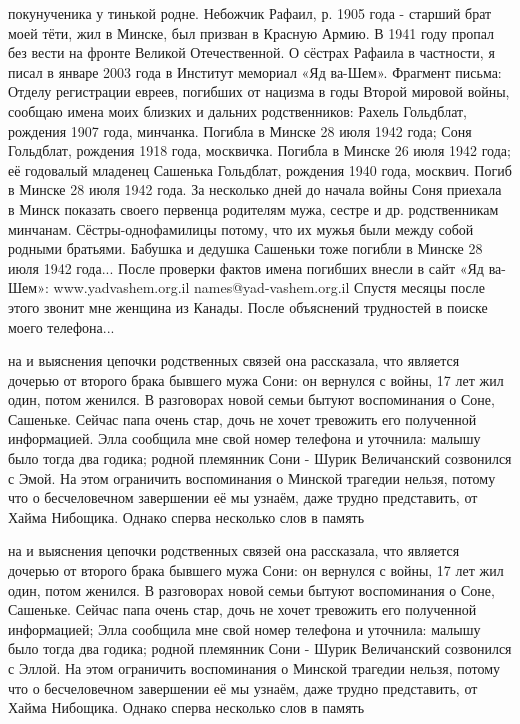 покунученика у тинькой родне. Небожчик Рафаил, р. 1905 года - старший брат моей тёти, жил в Минске, был призван в Красную Армию. В 1941 году пропал без вести на фронте Великой Отечественной. О сёстрах Рафаила в частности, я писал в январе 2003 года в Институт мемориал «Яд ва-Шем». Фрагмент письма: Отделу регистрации евреев, погибших от нацизма в годы Второй мировой войны, сообщаю имена моих близких и дальних родственников: Рахель Гольдблат, рождения 1907 года, минчанка. Погибла в Минске 28 июля 1942 года; Соня Гольдблат, рождения 1918 года, москвичка. Погибла в Минске 26 июля 1942 года; её годовалый младенец Сашенька Гольдблат, рождения 1940 года, москвич. Погиб в Минске 28 июля 1942 года. За несколько дней до начала войны Соня приехала в Минск показать своего первенца родителям мужа, сестре и др. родственникам минчанам. Сёстры-однофамилицы потому, что их мужья были между собой родными братьями. Бабушка и дедушка Сашеньки тоже погибли в Минске 28 июля 1942 года... После проверки фактов имена погибших внесли в сайт «Яд ва-Шем»: www.yadvashem.org.il names@yad-vashem.org.il Спустя месяцы после этого звонит мне женщина из Канады. После объяснений трудностей в поиске моего телефона...

на и выяснения цепочки родственных связей она рассказала, что является дочерью от второго брака бывшего мужа Сони: он вернулся с войны, 17 лет жил один, потом женился. В разговорах новой семьи бытуют воспоминания о Соне, Сашеньке. Сейчас папа очень стар, дочь не хочет тревожить его полученной информацией. Элла сообщила мне свой номер телефона и уточнила: малышу было тогда два годика; родной племянник Сони - Шурик Величанский созвонился с Эмой. На этом ограничить воспоминания о Минской трагедии нельзя, потому что о бесчеловечном завершении её мы узнаём, даже трудно представить, от Хайма Нибощика. Однако сперва несколько слов в память

на и выяснения цепочки родственных связей она рассказала, что является дочерью от второго брака бывшего мужа Сони: он вернулся с войны, 17 лет жил один, потом женился. В разговорах новой семьи бытуют воспоминания о Соне, Сашеньке. Сейчас папа очень стар, дочь не хочет тревожить его полученной информацией; Элла сообщила мне свой номер телефона и уточнила: малышу было тогда два годика; родной племянник Сони - Шурик Величанский созвонился с Эллой. На этом ограничить воспоминания о Минской трагедии нельзя, потому что о бесчеловечном завершении её мы узнаём, даже трудно представить, от Хайма Нибощика. Однако сперва несколько слов в память

